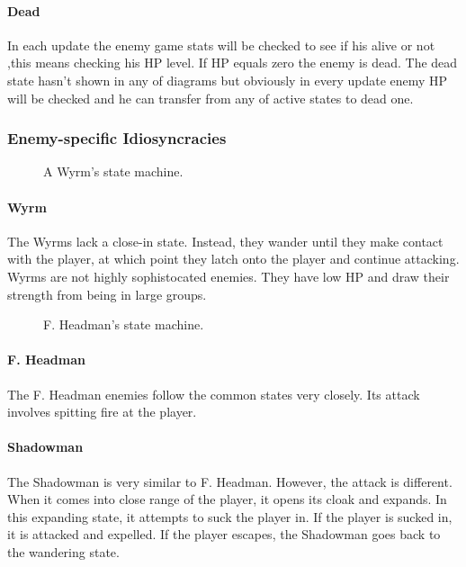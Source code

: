\documentclass{article}
\begin{document}
\paragraph{Dead}
In each update the enemy game stats will be checked to see if his alive or not ,this means checking his HP level. If HP equals zero the enemy is dead. The dead state hasn’t shown in any
of diagrams but obviously in every update enemy HP will be checked and he can transfer from any of active states to dead one.

\subsubsection{Enemy-specific Idiosyncracies}



\begin{figure}[h!]
{

}
\caption{A Wyrm's state machine.}
\label{FSMWyrm}

\end{figure}
\paragraph{Wyrm}
The Wyrms lack a close-in state.  Instead, they wander until they make contact with the player, at which point they latch onto the player and continue attacking.  Wyrms are not highly sophistocated enemies.  They have low HP and draw their strength from being in large groups.

\begin{figure}[h!]
{

}
\caption{F. Headman's state machine.}
\label{FSMFHead}
\end{figure}

\paragraph{F. Headman}
The F. Headman enemies follow the common states very closely.  Its attack involves spitting fire at the player.



\paragraph{Shadowman}
The Shadowman is very similar to F. Headman.  However, the attack is different.  When it comes into close range of the player, it opens its cloak and expands.  In this expanding state, it attempts to suck the player in.  If the player is sucked in, it is attacked and expelled.  If the player escapes, the Shadowman goes back to the wandering state.
\end{document}
